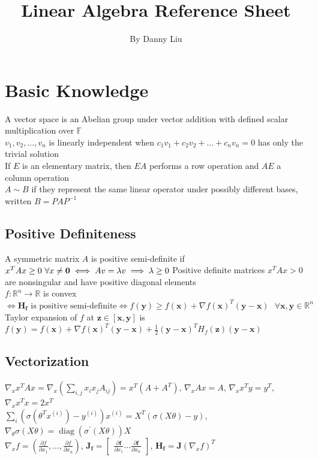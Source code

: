 \documentclass{article}
\title{Linear Algebra Reference Sheet}
\author{By Danny Liu}
\date{}
\DeclareMathOperator{\diag}{diag}
\newcommand{\F}{\mathbb{F}}
\newcommand{\real}{\mathbb{R}}
\begin{document}
\maketitle

\section{Basic Knowledge}
A vector space is an Abelian group under vector addition with defined scalar multiplication over $\F$ \\
$v_1, v_2, ..., v_n$ is linearly independent when $c_1v_1 + c_2v_2 + \ldots + c_nv_n = 0$ has only the trivial solution\\
If $E$ is an elementary matrix, then $EA$ performs a row operation and $AE$ a column operation \\
$A \sim B$ if they represent the same linear operator under possibly different bases, written ${B = PAP^{-1}}$  

\subsection{Positive Definiteness}
A symmetric matrix $A$ is positive semi-definite if $x^TAx \geq 0 \mbox{ } \forall x \neq \boldsymbol{0} \iff Av = \lambda v \implies \lambda \geq 0 \\$
Positive definite matrices $x^TAx > 0$ are nonsingular and have positive diagonal elements \\
$f: \real^n \rightarrow \real$ is convex $\iff {\boldsymbol{H}_{\boldsymbol{f}} \mbox{ is positive semi-definite} \iff f(\boldsymbol{y}) \geq f(\boldsymbol{x}) + {\nabla f(\boldsymbol{x})}^T (\boldsymbol{y}-\boldsymbol{x}) \mbox{ }\forall \boldsymbol{x}, \boldsymbol{y} \in \real^n }$\\
Taylor expansion of $f$ at $\boldsymbol{z} \in [\boldsymbol{x}, \boldsymbol{y}]$ is $f(\boldsymbol{y}) =  f(\boldsymbol{x}) + {\nabla f(\boldsymbol{x})}^T (\boldsymbol{y}-\boldsymbol{x}) + \frac{1}{2}(\boldsymbol{y}-\boldsymbol{x})^TH_f(\boldsymbol{z})(\boldsymbol{y}-\boldsymbol{x})$

\subsection{Vectorization}
$\nabla_x x^TAx = \nabla_x (\sum_{i, j}x_i x_j A_{ij}) = x^T(A + A^T)$, $\nabla_x Ax = A$, $\nabla_x x^Ty = y^T$, $\nabla_x x^Tx = 2x^T$ \\
$\sum_i(\sigma(\theta^Tx^{(i)}) - y^{(i)})x^{(i)} = X^T(\sigma(X\theta) - y)$, $\nabla_\theta \sigma(X\theta) = \diag(\sigma^\prime (X\theta))X$ \\
$\nabla_x f = (\frac{\partial f}{\partial x_1}, \ldots , \frac{\partial f}{\partial x_n})$, $\boldsymbol{J}_{\boldsymbol{f}} = \begin{bmatrix} \frac{\partial \boldsymbol{f}}{\partial x_1} \ldots \frac{\partial \boldsymbol{f}}{\partial x_n} \end{bmatrix}$, $\boldsymbol{H}_{\boldsymbol{f}} = \boldsymbol{J}(\nabla_x f)^T$
\end{document}
